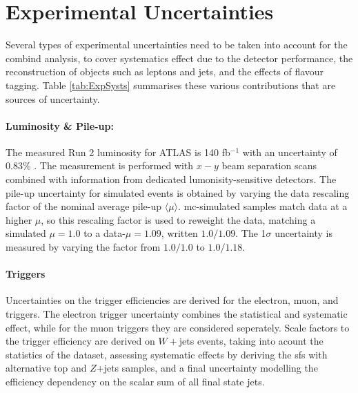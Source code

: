 \section{Experimental Uncertainties}\label{sec-unc}
Several types of experimental uncertainties need to be taken into account for the combind analysis, to cover systematics effect due to the detector performance, the reconstruction of objects such as leptons and jets, and the effects of flavour tagging. Table \ref{tab:ExpSysts} summarises these various contributions that are sources of uncertainty.


\paragraph{Luminosity \& Pile-up:} The measured Run 2 luminosity for ATLAS is 140 fb$^{-1}$ with an uncertainty of 0.83\% \cite{ATLAS:2022hro}. The measurement is performed with $x-y$ beam separation scans combined with information from dedicated lumonisity-sensitive detectors. The pile-up uncertainty for simulated events is obtained by varying the data rescaling factor of the nominal average pile-up $\langle \mu \rangle$. \gls{mc}-simulated samples match data at a higher $\mu$, so this rescaling factor is used to reweight the data, matching a simulated $\mu = 1.0$ to a data-$\mu = 1.09$, written $1.0/1.09$. The 1$\sigma$ uncertainty is measured by varying the factor from $1.0/1.0$ to $1.0/1.18$. %

\paragraph{Triggers} Uncertainties on the trigger efficiencies are derived for the electron, muon, and \etm triggers. The electron trigger uncertainty combines the statistical and systematic effect, while for the muon triggers they are considered seperately. Scale factors to the \etm trigger efficiency are derived on $W+$jets events, taking into acount the statistics of the dataset, assessing systematic effects by deriving the \gls{sf}s with alternative top and $Z$+jets samples, and a final uncertainty modelling the efficiency dependency on the scalar sum of all final state jets. %

